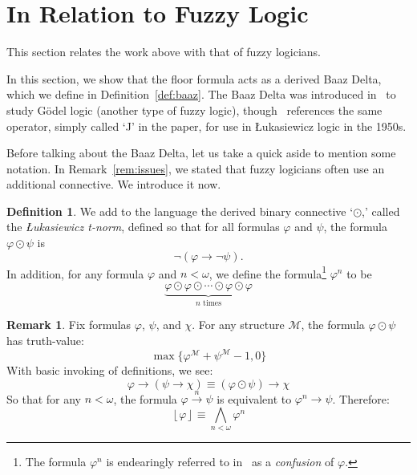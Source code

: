 \documentclass{amsart}
\theoremstyle{definition}
\newtheorem{remark}[theorem]{Remark}
\newtheorem{definition}[theorem]{Definition}
\numberwithin{equation}{theorem}
\renewcommand{\phi}{\varphi}
\newcommand{\strict}[1]{{\left\lfloor#1\right\rfloor}}
\newcommand{\narrow}[1]{\xrightarrow{#1}}
\renewcommand{\to}{\narrow{}}
\begin{document}
\section{In Relation to Fuzzy Logic}\label{sec:fuzzy-logic}
This section relates the work above with that of fuzzy logicians.

In this section, we show that the floor formula acts as a derived Baaz Delta, which we define in Definition~\ref{def:baaz}.
The Baaz Delta was introduced in~\cite{baaz1996infinite} to study G\"odel logic (another type of fuzzy logic), though~\cite{rose1958fragments} references the same operator, simply called `J' in the paper, for use in {\L}ukasiewicz logic in the 1950s.

Before talking about the Baaz Delta, let us take a quick aside to mention some notation.
In Remark~\ref{rem:issues}, we stated that fuzzy logicians often use an additional connective.
We introduce it now.
\begin{definition}
  We add to the language the derived binary connective `$\odot$,' called the \emph{{\L}ukasiewicz t-norm}, defined so that for all formulas $\phi$ and $\psi$, the formula $\phi\odot\psi$ is
  \[
    \neg(\phi\to\neg\psi).
  \]
  In addition, for any formula $\phi$ and $n<\omega$, we define the formula\footnote{The formula $\phi^n$ is endearingly referred to in~\cite{metcalfe2008proof} as a \emph{confusion} of $\phi$.} $\phi^n$ to be
  \[
    \underbrace{\phi\odot\phi\odot\cdots\odot\phi\odot\phi}_\text{$n$ times}
  \]
\end{definition}
\begin{remark}
  Fix formulas $\phi$, $\psi$, and $\chi$.
  For any structure $\mathcal M$, the formula $\phi\odot\psi$ has truth-value:
  \[
    \max\{\phi^\mathcal M+\psi^\mathcal M-1, 0\}
  \]
  With basic invoking of definitions, we see:
  \[
    \phi\to(\psi\to\chi)\equiv (\phi\odot\psi)\to\chi
  \]
  So that for any $n<\omega$, the formula $\phi\narrow{n}\psi$ is equivalent to $\phi^n\to\psi$.
  Therefore:
  \[
    \strict{\phi}\equiv \bigwedge_{n<\omega}\phi^n
  \]
\end{remark}
\end{document}
